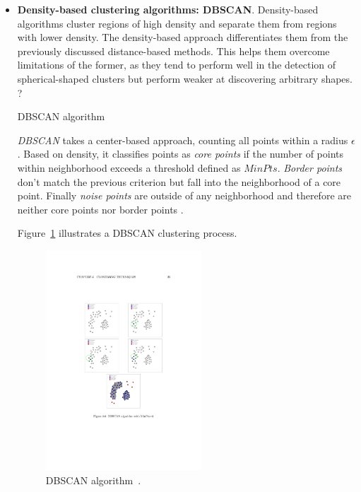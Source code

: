 \begin{itemize}
\item \textbf{Density-based clustering algorithms: DBSCAN}. Density-based algorithms cluster regions of high density and separate them from regions with lower density. The density-based approach differentiates them from the previously discussed distance-based methods. This helps them overcome limitations of the former, as they tend to perform well in the detection of spherical-shaped clusters but perform weaker at discovering arbitrary shapes.
?
\begin{algorithm}[t]
  \caption{DBSCAN algorithm~\cite{Meert06clustermaps}}
  \label{alg:dbscan}
\end{algorithm}

\textit{DBSCAN} takes a center-based approach, counting all points within a radius $\epsilon$. Based on density, it classifies points as \textit{core points} if the number of points within neighborhood exceeds a threshold defined as $MinPts$. \textit{Border points} don't match the previous criterion but fall into the neighborhood of a core point. Finally \textit{noise points} are outside of any neighborhood and therefore are neither core points nor border points \cite{Varlaro08spatial, Meert06clustermaps}. 

Figure~\ref{fig:clustering-dbscan} illustrates a DBSCAN clustering process.

\begin{figure}[h]
  \begin{center}
    \includegraphics[width=0.55\textwidth]{figures/clustering_dbscan.pdf}
    \caption{DBSCAN algorithm~\cite[p 26]{Meert06clustermaps}.}
    \label{fig:clustering-dbscan}
  \end{center}
\end{figure}


\end{itemize}
